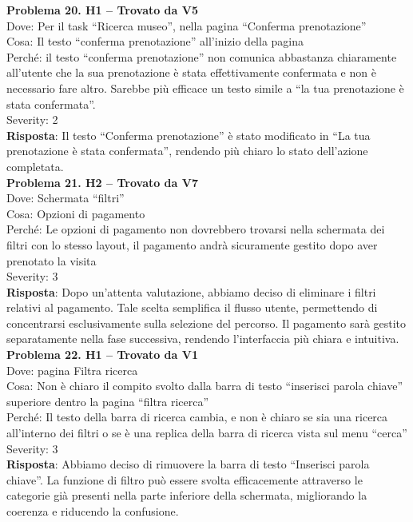 \documentclass{article}
\begin{document}
\noindent \textbf{Problema 20. H1 – Trovato da V5} \\
Dove: Per il task “Ricerca museo”, nella pagina “Conferma prenotazione” \\
Cosa: Il testo “conferma prenotazione” all’inizio della pagina \\
Perché: il testo “conferma prenotazione” non comunica abbastanza chiaramente all’utente che la sua prenotazione è stata effettivamente confermata e non è necessario fare altro. Sarebbe più efficace un testo simile a “la tua prenotazione è stata confermata”. \\
Severity: 2 \\
\textbf{Risposta}: Il testo “Conferma prenotazione” è stato modificato in “La tua prenotazione è stata confermata”, rendendo più chiaro lo stato dell’azione completata.\\

\noindent \textbf{Problema 21. H2 – Trovato da V7} \\
Dove: Schermata “filtri” \\
Cosa: Opzioni di pagamento \\
Perché: Le opzioni di pagamento non dovrebbero trovarsi nella schermata dei filtri con lo stesso layout, il pagamento andrà sicuramente gestito dopo aver prenotato la visita \\
Severity: 3 \\
\textbf{Risposta}: Dopo un'attenta valutazione, abbiamo deciso di eliminare i filtri relativi al pagamento. Tale scelta semplifica il flusso utente, permettendo di concentrarsi esclusivamente sulla selezione del percorso. Il pagamento sarà gestito separatamente nella fase successiva, rendendo l’interfaccia più chiara e intuitiva.\\

\noindent \textbf{Problema 22. H1 – Trovato da V1} \\
Dove: pagina Filtra ricerca \\
Cosa: Non è chiaro il compito svolto dalla barra di testo “inserisci parola chiave” superiore dentro la pagina “filtra ricerca” \\
Perché: Il testo della barra di ricerca cambia, e non è chiaro se sia una ricerca all’interno dei filtri o se è una replica della barra di ricerca vista sul menu “cerca” \\
Severity: 3 \\
\textbf{Risposta}: Abbiamo deciso di rimuovere la barra di testo “Inserisci parola chiave”. La funzione di filtro può essere svolta efficacemente attraverso le categorie già presenti nella parte inferiore della schermata, migliorando la coerenza e riducendo la confusione.\\
\end{document}
